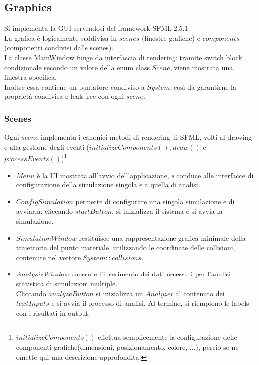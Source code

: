\documentclass{article}
\begin{document}
\subsection{Graphics}
Si implementa la GUI servendosi del framework SFML 2.5.1.\\
La grafica è logicamente suddivisa in $scenes$ (finestre grafiche) e $components$ (componenti condivisi dalle scenes).\\
La classe MainWindow funge da interfaccia di rendering: tramite switch block condizionale secondo un valore della enum class $Scene$, viene mostrata una finestra specifica.\\
Inoltre essa contiene un puntatore condiviso a $System$, così da garantirne la proprietà condivisa e leak-free con ogni $scene$.

\subsubsection{Scenes}
Ogni $scene$ implementa i canonici metodi di rendering di SFML, volti al drawing e alla gestione degli eventi ($initializeComponents()$, $draw()$ e $processEvents()$)\footnote{$initializeComponents()$ effettua semplicemente la configurazione delle componenti grafiche(dimensioni, posizionamento, colore, ...), perciò se ne omette qui una descrizione approfondita.}

\begin{itemize}
    \item $Menu$ è la UI mostrata all'avvio dell'applicazione, e conduce alle interfacce di configurazione della simulazione singola e a quella di analisi.
    \item $ConfigSimulation$ permette di configurare una singola simulazione e di avviarla: cliccando $startButton$, si inizializza il sistema e si avvia la simulazione.
    \item $SimulationWindow$ restituisce una rappresentazione grafica minimale della traiettoria del punto materiale, utilizzando le coordinate delle collisioni, contenute nel vettore $System::collisions$.
    \item $AnalysisWindow$ consente l'inserimento dei dati necessari per l'analisi statistica di simulazioni multiple. \\ Cliccando $analyzeButton$ si inizializza un $Analyzer$ al contenuto dei $textInputs$ e si avvia il processo di analisi. Al termine, si riempiono le labels con i risultati in output.
\end{itemize}
\end{document}
